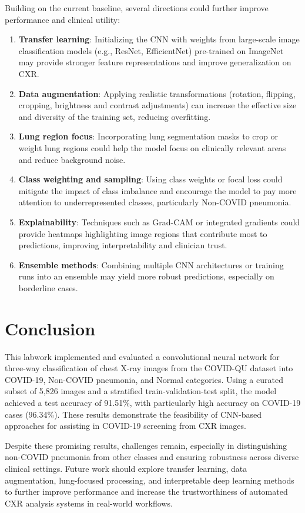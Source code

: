 \documentclass[conference]{IEEEtran}
\begin{document}
Building on the current baseline, several directions could further improve performance and clinical utility:
\begin{enumerate}
    \item \textbf{Transfer learning}: Initializing the CNN with weights from large-scale image classification models (e.g., ResNet, EfficientNet) pre-trained on ImageNet may provide stronger feature representations and improve generalization on CXR.
    \item \textbf{Data augmentation}: Applying realistic transformations (rotation, flipping, cropping, brightness and contrast adjustments) can increase the effective size and diversity of the training set, reducing overfitting.
    \item \textbf{Lung region focus}: Incorporating lung segmentation masks to crop or weight lung regions could help the model focus on clinically relevant areas and reduce background noise.
    \item \textbf{Class weighting and sampling}: Using class weights or focal loss could mitigate the impact of class imbalance and encourage the model to pay more attention to underrepresented classes, particularly Non-COVID pneumonia.
    \item \textbf{Explainability}: Techniques such as Grad-CAM or integrated gradients could provide heatmaps highlighting image regions that contribute most to predictions, improving interpretability and clinician trust.
    \item \textbf{Ensemble methods}: Combining multiple CNN architectures or training runs into an ensemble may yield more robust predictions, especially on borderline cases.
\end{enumerate}

\section{Conclusion}

This labwork implemented and evaluated a convolutional neural network for three-way classification of chest X-ray images from the COVID-QU dataset into COVID-19, Non-COVID pneumonia, and Normal categories. Using a curated subset of 5{,}826 images and a stratified train-validation-test split, the model achieved a test accuracy of 91.51\%, with particularly high accuracy on COVID-19 cases (96.34\%). These results demonstrate the feasibility of CNN-based approaches for assisting in COVID-19 screening from CXR images.

Despite these promising results, challenges remain, especially in distinguishing non-COVID pneumonia from other classes and ensuring robustness across diverse clinical settings. Future work should explore transfer learning, data augmentation, lung-focused processing, and interpretable deep learning methods to further improve performance and increase the trustworthiness of automated CXR analysis systems in real-world workflows.
\end{document}
